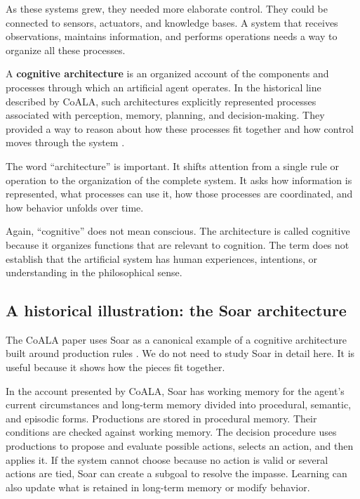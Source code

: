 As these systems grew, they needed more elaborate control. They could be connected to sensors, actuators, and knowledge bases. A system that receives observations, maintains information, and performs operations needs a way to organize all these processes.

A \textbf{cognitive architecture} is an organized account of the components and processes through which an artificial agent operates. In the historical line described by CoALA, such architectures explicitly represented processes associated with perception, memory, planning, and decision-making. They provided a way to reason about how these processes fit together and how control moves through the system .

The word ``architecture'' is important. It shifts attention from a single rule or operation to the organization of the complete system. It asks how information is represented, what processes can use it, how those processes are coordinated, and how behavior unfolds over time.

Again, ``cognitive'' does not mean conscious. The architecture is called cognitive because it organizes functions that are relevant to cognition. The term does not establish that the artificial system has human experiences, intentions, or understanding in the philosophical sense.

\subsection{A historical illustration: the Soar architecture}\label{a-historical-illustration-the-soar-architecture}

The CoALA paper uses Soar as a canonical example of a cognitive architecture built around production rules . We do not need to study Soar in detail here. It is useful because it shows how the pieces fit together.

In the account presented by CoALA, Soar has working memory for the agent's current circumstances and long-term memory divided into procedural, semantic, and episodic forms. Productions are stored in procedural memory. Their conditions are checked against working memory. The decision procedure uses productions to propose and evaluate possible actions, selects an action, and then applies it. If the system cannot choose because no action is valid or several actions are tied, Soar can create a subgoal to resolve the impasse. Learning can also update what is retained in long-term memory or modify behavior.

